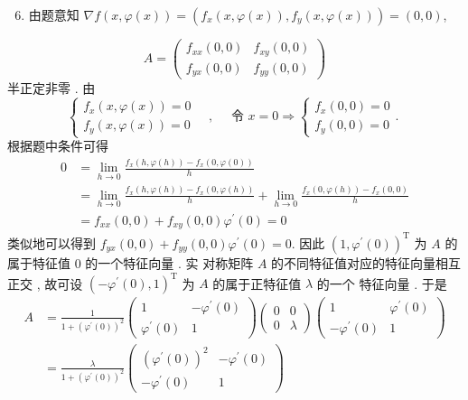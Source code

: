 \documentclass[10pt]{article}
\begin{document}
\begin{enumerate}
  \setcounter{enumi}{5}
  \item  由题意知  $\nabla f(x, \varphi(x))=\left(f_{x}(x, \varphi(x)), f_{y}(x, \varphi(x))\right)=(0,0)$,
\end{enumerate}
$$
A=\left(\begin{array}{ll}
f_{x x}(0,0) & f_{x y}(0,0) \\
f_{y x}(0,0) & f_{y y}(0,0)
\end{array}\right)
$$
 半正定非零 .  由 
$$
\left\{\begin{array}{l}
f_{x}(x, \varphi(x))=0 \\
f_{y}(x, \varphi(x))=0
\end{array} \quad, \quad \text { 令 } x=0 \Longrightarrow\left\{\begin{array}{l}
f_{x}(0,0)=0 \\
f_{y}(0,0)=0
\end{array}\right. \text {. }\right.
$$
 根据题中条件可得 
$$
\begin{aligned}
0 &=\lim _{h \rightarrow 0} \frac{f_{x}(h, \varphi(h))-f_{x}(0, \varphi(0))}{h} \\
&=\lim _{h \rightarrow 0} \frac{f_{x}(h, \varphi(h))-f_{x}(0, \varphi(h))}{h}+\lim _{h \rightarrow 0} \frac{f_{x}(0, \varphi(h))-f_{x}(0,0)}{h} \\
&=f_{x x}(0,0)+f_{x y}(0,0) \varphi^{\prime}(0)=0
\end{aligned}
$$
 类似地可以得到  $f_{y x}(0,0)+f_{y y}(0,0) \varphi^{\prime}(0)=0$.  因此  $\left(1, \varphi^{\prime}(0)\right)^{\mathrm{T}}$  为  $A$  的属于特征值  0  的一个特征向量 .  实   对称矩阵  $A$  的不同特征值对应的特征向量相互正交 ,  故可设  $\left(-\varphi^{\prime}(0), 1\right)^{\mathrm{T}}$  为  $A$  的属于正特征值  $\lambda$  的一个   特征向量 .  于是 
$$
\begin{aligned}
A &=\frac{1}{1+\left(\varphi^{\prime}(0)\right)^{2}}\left(\begin{array}{cc}
1 & -\varphi^{\prime}(0) \\
\varphi^{\prime}(0) & 1
\end{array}\right)\left(\begin{array}{ll}
0 & 0 \\
0 & \lambda
\end{array}\right)\left(\begin{array}{cc}
1 & \varphi^{\prime}(0) \\
-\varphi^{\prime}(0) & 1
\end{array}\right) \\
&=\frac{\lambda}{1+\left(\varphi^{\prime}(0)\right)^{2}}\left(\begin{array}{cc}
\left(\varphi^{\prime}(0)\right)^{2} & -\varphi^{\prime}(0) \\
-\varphi^{\prime}(0) & 1
\end{array}\right)
\end{aligned}
$$
\end{document}
